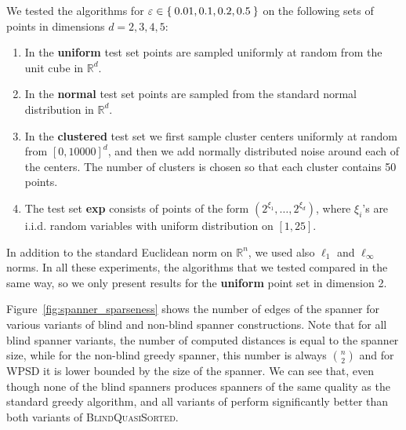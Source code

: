 \documentclass[]{ws-ijcga}
\newcommand{\eps}{\varepsilon}
\newcommand{\RR}{\mathbb{R}}
\begin{document}

We tested the algorithms for $\eps \in \Set{0.01, 0.1, 0.2, 0.5}$ on the following sets of points in dimensions $d = 2,3,4,5$:
\begin{enumerate}
    \item In the \textbf{uniform} test set points are sampled uniformly at
        random from the unit cube in $\mathbb{R}^d$.
    \item In the \textbf{normal} test set points are sampled from the standard
        normal distribution in $\mathbb{R}^d$.
    \item In the \textbf{clustered} test set we first sample cluster centers uniformly 
        at random from $[0,10000]^d$, and then we add normally distributed noise around
        each of the centers. The number of clusters is chosen so that each cluster
        contains 50 points.
    \item The test set \textbf{exp} consists of points of the form $(2^{\xi_1}, \dots, 2^{\xi_d})$,
        where $\xi_i$'s are i.i.d. random variables with uniform distribution on $[1,25]$.
\end{enumerate}
In addition to the standard Euclidean norm on $\RR^n$, we used also $\ell_1$ and $\ell_\infty$ norms.
In all these experiments, the algorithms that we tested compared in the same way,
so we only present results for the \textbf{uniform} point set in dimension 2.



Figure~\ref{fig:spanner_sparseness}
shows the number of edges of the spanner for various variants of 
blind and non-blind spanner constructions.
Note that for all blind spanner variants, the number of computed distances
is equal to the spanner size, while for the non-blind greedy spanner,
this number is always $\binom{n}{2}$ and for WPSD it is lower bounded
by the size of the spanner.
We can see that, even though none of the blind spanners produces
spanners of the same quality as the standard greedy algorithm,
\bgrdy and all variants of \brndm
perform significantly better than both variants of \textsc{BlindQuasiSorted}.
\end{document}
